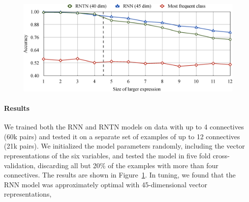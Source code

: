 \begin{figure}[t]
  \centering
  \includegraphics[width=5.3in]{decayfig.eps}
  \caption{
    }  
  \label{prop-results}
\end{figure}

\paragraph{Results} 
We trained both the RNN and RNTN models on data with up to 4
connectives (60k pairs) and tested it on a separate set of examples of up to 12
connectives (21k pairs). We initialized the model parameters randomly,
including the vector representations of the six variables, and tested the model
in five fold cross-validation, discarding all but 20\% of the examples with 
more than four connectives. The results are shown in Figure~\ref{prop-results}. 
In tuning, we found that the
RNN model was approximately optimal with 45-dimensional vector
representations, 

